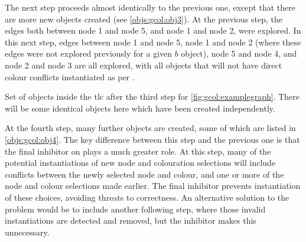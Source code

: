 The next step proceeds almost identically to the previous one, except that there are more new objects created (see \cref{objs:gcol:obj3}).  At the previous step, the edges both between node 1 and node 5, and node 1 and node 2, were explored.  In this next step, edges between node 1 and node 5, node 1 and node 2 (where these edges were not explored previously for a given \(b\) object), node 5 and node 4, and node 2 and node 3 are all explored, with all objects that will not have direct colour conflicts instantiated as per .

\begin{cpobjectsfloat}
\begin{cpobjects}
%    
    \cpobjectsline{
        \vdots
    }
\end{cpobjects}
\caption[Set of objects after the third step for the  \gls{cps} solution]{\label{objs:gcol:obj3}Set of objects inside the \gls{tlc} after the third step for \cref{fig:gcol:examplegraph}.  There will be some identical objects here which have been created independently.}
\end{cpobjectsfloat}

At the fourth step, many further objects are created, some of which are listed in \cref{objs:gcol:obj4}.  The key difference between this step and the previous one is that the final \gls{inhibitor} on  plays a much greater role.  At this step, many of the potential instantiations of new node and colouration selections will include conflicts between the newly selected node and colour, and one or more of the node and colour selections made earlier.  The final \gls{inhibitor} prevents instantiation of these choices, avoiding threats to correctness.  An alternative solution to the problem would be to include another following step, where those invalid instantiations are detected and removed, but the \gls{inhibitor} makes this unnecessary.  

